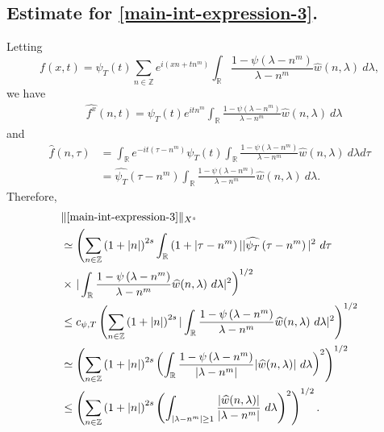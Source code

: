\documentclass[12pt,reqno]{amsart}
\numberwithin{equation}{section}  %
\numberwithin{figure}{section}
\newcommand{\rr}{\mathbb{R}}
\newcommand{\zz}{\mathbb{Z}}
\newcommand{\wh}{\widehat}
\theoremstyle{plain}
\theoremstyle{definition}
\theoremstyle{remark}
\begin{document}
\subsection{Estimate for \eqref{main-int-expression-3}.}
Letting $$f(x,t) = \psi_{T}(t) \sum_{n \in \zz} e^{i\left( xn + tn^{m} \right)} 
\int_\rr \frac{1 - \psi\left( \lambda - n^{m} \right)}{\lambda - n^{m}} 
\wh{w} \left( n, \lambda \right) \ d \lambda,$$ we have
%
%
\begin{equation*}
	\begin{split}
		& \wh{f^x}(n, t) = \psi_{T}(t) e^{itn^{m}} \int_\rr
		\frac{1 - \psi\left( \lambda - n^{m} \right)}{\lambda - n^{m}} 
		\wh{w}(n, \lambda) \ d \lambda
	\end{split}
\end{equation*}
and
\begin{equation*}
	\begin{split}
		 \wh{f}\left( n, \tau \right)
		 & = \int_\rr e^{-it\left( \tau - n^{m} 
		\right)} \psi_{T}(t) \int_\rr \frac{1 - \psi\left( 
		\lambda - n^{m} 
		\right)}{\lambda - n^{m}} \wh{w}(n, \lambda) \ d \lambda d \tau
		\\
    & = \wh{\psi_{T}}\left( \tau - n^{m} \right) \int_\rr 
		\frac{1 - \psi\left( 
		\lambda - n^{m} 
		\right)}{\lambda - n^{m}} \wh{w}(n, \lambda) \ d \lambda.
	\end{split}
\end{equation*}
Therefore,
%
%
\begin{equation}
  \label{iu}
	\begin{split}
		& \| \eqref{main-int-expression-3} \|_{X^s} 
		\\
		& \simeq \left( \sum_{n \in \zz} \left (1 + |n| \right )^{2s} \int_\rr \left( 1 + | \tau - n^{m
    } \right ) | | \wh{\psi_{T}}\left( \tau - n^{m } \right) |^2 \ d \tau
		\right.
		\\
		& \times \left . |
		\int_\rr \frac{1 - \psi\left( \lambda - n^{m } \right)}{\lambda -
		n^{m }} \wh{w}(n, \lambda) \ d \lambda |^2  \right)^{1/2}
		\\
    & \le c_{\psi, T}\left( \sum_{n \in \zz} \left (1 + |n| \right )^{2s} | \int_\rr
		\frac{1 - \psi\left( \lambda - n^{m } \right)}{\lambda - n^{m }}
		\wh{w}(n, \lambda) \ d\lambda |^2 \right)^{1/2}
		\\
		& \simeq \left( \sum_{n \in \zz} \left (1 + |n| \right )^{2s}  \left ( \int_\rr
		\frac{1 - \psi\left( \lambda - n^{m } \right)}{|\lambda - n^{m }|}
		|\wh{w}(n, \lambda) | \ d\lambda \right )^2 \right)^{1/2}
		\\
		& \le \left( \sum_{n \in \zz} \left (1 + |n| \right )^{2s}  \left ( \int_{| \lambda - 
		n^{m } | \ge 1}
		\frac{|\wh{w}(n, \lambda) | }{|\lambda - n^{m }|}
		\ d\lambda \right )^2 \right)^{1/2}.
	\end{split}
\end{equation}
\end{document}
